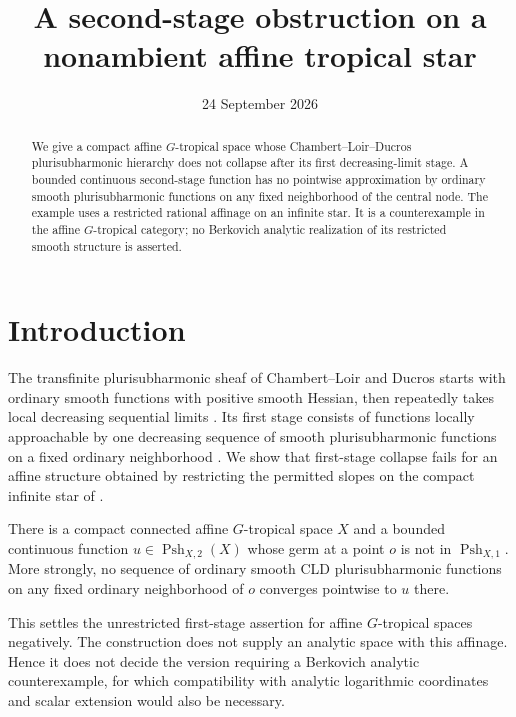 \documentclass[11pt,a4paper]{amsart}
\title[Second-stage affine star]{A second-stage obstruction on a nonambient affine tropical star}
\author{}
\date{24 September 2026}
\begin{document}
\begin{abstract}
We give a compact affine $G$-tropical space whose Chambert--Loir--Ducros plurisubharmonic hierarchy does not collapse after its first decreasing-limit stage. A bounded continuous second-stage function has no pointwise approximation by ordinary smooth plurisubharmonic functions on any fixed neighborhood of the central node. The example uses a restricted rational affinage on an infinite star. It is a counterexample in the affine $G$-tropical category; no Berkovich analytic realization of its restricted smooth structure is asserted.
\end{abstract}

\maketitle

\section{Introduction}

The transfinite plurisubharmonic sheaf of Chambert--Loir and Ducros starts with ordinary smooth functions with positive smooth Hessian, then repeatedly takes local decreasing sequential limits \cite[Definition~8.1.1 and Lemma~8.1.4]{CLD12}. Its first stage consists of functions locally approachable by one decreasing sequence of smooth plurisubharmonic functions on a fixed ordinary neighborhood \cite[Definition~8.1.13]{CLD12}. We show that first-stage collapse fails for an affine structure obtained by restricting the permitted slopes on the compact infinite star of \cite[\S6.7.3]{CLD12}.

\begin{maintheorem}\label{thm:second-stage-star}
There is a compact connected affine $G$-tropical space $X$ and a bounded continuous function $u\in\operatorname{Psh}_{X,2}(X)$ whose germ at a point $o$ is not in $\operatorname{Psh}_{X,1}$. More strongly, no sequence of ordinary smooth CLD plurisubharmonic functions on any fixed ordinary neighborhood of $o$ converges pointwise to $u$ there.
\end{maintheorem}

This settles the unrestricted first-stage assertion for affine $G$-tropical spaces negatively. The construction does not supply an analytic space with this affinage. Hence it does not decide the version requiring a Berkovich analytic counterexample, for which compatibility with analytic logarithmic coordinates and scalar extension would also be necessary.
\end{document}

